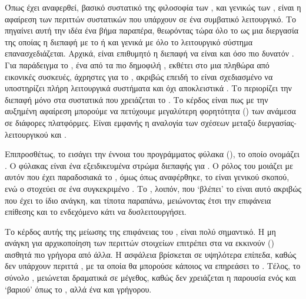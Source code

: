 Όπως έχει αναφερθεί, βασικό συστατικό της φιλοσοφία των ,
και γενικώς των , είναι η αφαίρεση
των περιττών συστατικών που υπάρχουν σε ένα συμβατικό
λειτουργικό. Το  πηγαίνει αυτή την ιδέα ένα βήμα παραπέρα,
θεωρόντας τώρα όλο το  ως μια διεργασία της οποίας
η διεπαφή με το  ή και γενικά με όλο το λειτουργικό
σύστημα επανασχεδιάζεται. Αρχικά, είναι επιθυμητό η διεπαφή να είναι
 και όσο πιο δυνατόν . Για παράδειγμα
το , ένα από τα πιο δημοφιλή , εκθέτει
στο  μια πληθώρα από εικονικές συσκευές, άχρηστες
για το , ακριβώς επειδή το  είναι σχεδιασμένο
να υποστηρίζει πλήρη λειτουργικά συστήματα και όχι αποκλειστικά
\cite{solo5Monitor}. Το  περιορίζει την διεπαφή μόνο στα
συστατικά που χρειάζεται το . Το κέρδος είναι πως με την
αυξημένη αφαίρεση μπορούμε να πετύχουμε μεγαλύτερη φορητότητα
() των  ανάμεσα σε διάφορες πλατφόρμες\cite{Orestis}.
Είναι εμφανής η αναλογία των σχέσεων μεταξύ διεργασίας-λειτουργικού
και .
\newline

Επιπροσθέτως, το  εισάγει την έννοια του προγράμματος
φύλακα (), το οποίο ονομάζει .
Ο φύλακας είναι ένα εξειδικευμένα στρώμα διεπαφής για .
Ο ρόλος του μοιάζει με αυτόν που έχει παραδοσιακά το , όμως
όπως αναφέρθηκε, το  είναι γενικού σκοπού, ενώ ο 
στοχεύει σε ένα συγκεκριμένο . Το , λοιπόν,
που ‘βλέπει’ το  είναι αυτό ακριβώς που έχει το ίδιο
ανάγκη, και τίποτα παραπάνω, μειώνοντας έτσι την επιφάνεια
επίθεσης και το ενδεχόμενο κάτι να δυσλειτουργήσει.
\newline

Το κέρδος αυτής της μείωσης της επιφάνειας του , είναι
πολύ σημαντικό. Η μη ανάγκη για αρχικοποίηση των περιττών
στοιχείων επιτρέπει στα  να εκκινούν () αισθητά
πιο γρήγορα από άλλα. Η ασφάλεια βρίσκεται σε υψηλότερα επίπεδα,
καθώς δεν υπάρχουν περιττά , με τα οποία θα μπορούσε
κάποιος να επηρεάσει το . Τέλος, το σύνολο ,
μειώνεται δραματικά σε μέγεθος, καθώς δεν χρειάζεται η παρουσία
ενός  και ‘βαριού’  όπως το , αλλά ένα
 και γρήγορου\cite{solo5Monitor}\cite{Orestis}.
\newline

